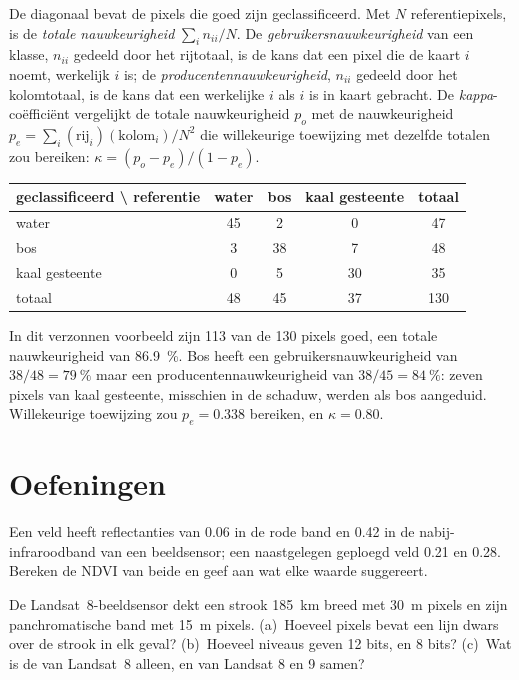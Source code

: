 De diagonaal bevat de pixels die goed zijn geclassificeerd. Met $N$ referentiepixels,
is de \emph{totale nauwkeurigheid} $\sum_i n_{ii}/N$. De \emph{gebruikersnauwkeurigheid}
van een klasse, $n_{ii}$ gedeeld door het rijtotaal, is de kans dat een
pixel die de kaart $i$ noemt, werkelijk $i$ is; de \emph{producentennauwkeurigheid}, $n_{ii}$
gedeeld door het kolomtotaal, is de kans dat een werkelijke $i$ als $i$ is in kaart gebracht. De
\emph{kappa}-coëfficiënt vergelijkt de totale nauwkeurigheid $p_o$ met de
nauwkeurigheid $p_e = \sum_i (\text{rij}_i)(\text{kolom}_i)/N^2$ die willekeurige
toewijzing met dezelfde totalen zou bereiken: $\kappa = (p_o - p_e)/(1 -
p_e)$.

\begin{center}
\small
\begin{tabular}{l|ccc|c}
\hline
geclassificeerd \textbackslash{} referentie & water & bos & kaal gesteente & totaal \\
\hline
water & 45 & 2 & 0 & 47 \\
bos & 3 & 38 & 7 & 48 \\
kaal gesteente & 0 & 5 & 30 & 35 \\
\hline
totaal & 48 & 45 & 37 & 130 \\
\hline
\end{tabular}
\end{center}

In dit verzonnen voorbeeld zijn 113 van de 130 pixels goed, een totale nauwkeurigheid
van \qty{86.9}{\percent}. Bos heeft een gebruikersnauwkeurigheid van
$38/48 = \qty{79}{\percent}$ maar een producentennauwkeurigheid van $38/45 =
\qty{84}{\percent}$: zeven pixels van kaal gesteente, misschien in de schaduw,
werden als bos aangeduid. Willekeurige toewijzing zou $p_e = 0.338$ bereiken, en $\kappa =
0.80$.

\section{Oefeningen}

\begin{exercise}[$\star$]\label{exo:b3:remote-sensing-gis:1}
Een veld heeft reflectanties van 0.06 in de rode band en 0.42 in de
nabij-infraroodband van een beeldsensor; een naastgelegen geploegd veld 0.21 en
0.28. Bereken de NDVI van beide en geef aan wat elke waarde suggereert.
\end{exercise}

\begin{exercise}[$\star$]\label{exo:b3:remote-sensing-gis:2}
De Landsat~8-beeldsensor dekt een strook \qty{185}{km} breed met \qty{30}{m}
pixels en zijn panchromatische band met \qty{15}{m} pixels. (a)~Hoeveel
pixels bevat een lijn dwars over de strook in elk geval? (b)~Hoeveel niveaus
geven 12 bits, en 8 bits? (c)~Wat is de  van Landsat~8
alleen, en van Landsat 8 en 9 samen?
\end{exercise}

